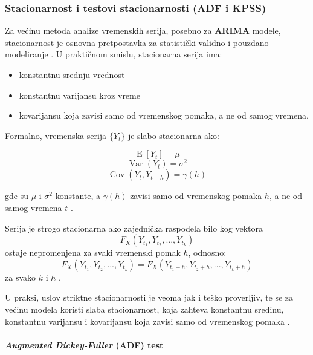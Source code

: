\documentclass[12pt]{article}
\begin{document}
\noindent



\subsubsection{Stacionarnost i testovi stacionarnosti (ADF i KPSS)}
\label{sec:stationarity}
Za većinu metoda analize vremenskih serija, posebno za \textbf{ARIMA} modele, stacionarnost je osnovna pretpostavka za statistički validno i pouzdano modeliranje \cite{box1970, dickey1979, kpss1992}. U praktičnom smislu, stacionarna serija ima:

\begin{itemize}
    \item konstantnu srednju vrednost
    \item konstantnu varijansu kroz vreme
    \item kovarijansu koja zavisi samo od vremenskog pomaka, a ne od samog vremena.
\end{itemize}

Formalno, vremenska serija $\{Y_t\}$ je slabo stacionarna ako:

\begin{equation*}
\operatorname{E}[Y_t] = \mu
\end{equation*}
\begin{equation*}
\operatorname{Var}(Y_t) = \sigma^2
\end{equation*}
\begin{equation*}
\operatorname{Cov}(Y_t, Y_{t+h}) = \gamma(h)
\end{equation*}

\noindent gde su $\mu$ i $\sigma^2$ konstante, a $\gamma(h)$ zavisi samo od vremenskog pomaka $h$, a ne od samog vremena $t$ \cite{box1970}.

\bigskip

\noindent Serija je strogo stacionarna ako zajednička raspodela bilo kog vektora
\[
F_X(Y_{t_1}, Y_{t_2}, ..., Y_{t_k})
\]
ostaje nepromenjena za svaki vremenski pomak $h$, odnosno:
\[
F_X(Y_{t_1}, Y_{t_2}, ..., Y_{t_k}) = F_X(Y_{t_1 + h}, Y_{t_2 + h}, ..., Y_{t_k + h})
\]
za svako $k$ i $h$ \cite{box1970}.

U praksi, uslov striktne stacionarnosti je veoma jak i teško proverljiv, te se za većinu modela koristi slaba stacionarnost, koja zahteva konstantnu sredinu, konstantnu varijansu i kovarijansu koja zavisi samo od vremenskog pomaka \cite{dickey1979, kpss1992}.
\paragraph{\textit{Augmented Dickey-Fuller} (ADF) test}
\end{document}
